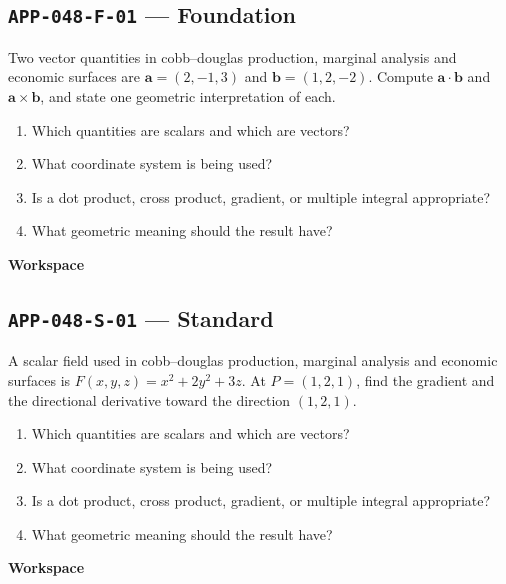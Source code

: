 \documentclass[11pt]{book}
\newcommand{\pid}[1]{\texttt{#1}}
\newcommand{\workspace}{\par\vspace{0.7in}\hrulefill\par\vspace{0.55in}\hrulefill\par}
\begin{document}
\subsection*{\pid{APP-048-F-01} — Foundation}
\begin{problembox}
Two vector quantities in cobb–douglas production, marginal analysis and economic surfaces are $\mathbf a=(2,-1,3)$ and $\mathbf b=(1,2,-2)$. Compute $\mathbf a\cdot\mathbf b$ and $\mathbf a\times\mathbf b$, and state one geometric interpretation of each.
\end{problembox}
\begin{promptbox}\begin{enumerate}
\item Which quantities are scalars and which are vectors?
\item What coordinate system is being used?
\item Is a dot product, cross product, gradient, or multiple integral appropriate?
\item What geometric meaning should the result have?
\end{enumerate}\end{promptbox}
\textbf{Workspace}\workspace
{}
\subsection*{\pid{APP-048-S-01} — Standard}
\begin{problembox}
A scalar field used in cobb–douglas production, marginal analysis and economic surfaces is $F(x,y,z)=x^2+2y^2+3z$. At $P=(1,2,1)$, find the gradient and the directional derivative toward the direction $(1,2,1)$.
\end{problembox}
\begin{promptbox}\begin{enumerate}
\item Which quantities are scalars and which are vectors?
\item What coordinate system is being used?
\item Is a dot product, cross product, gradient, or multiple integral appropriate?
\item What geometric meaning should the result have?
\end{enumerate}\end{promptbox}
\textbf{Workspace}\workspace
{}
\end{document}
